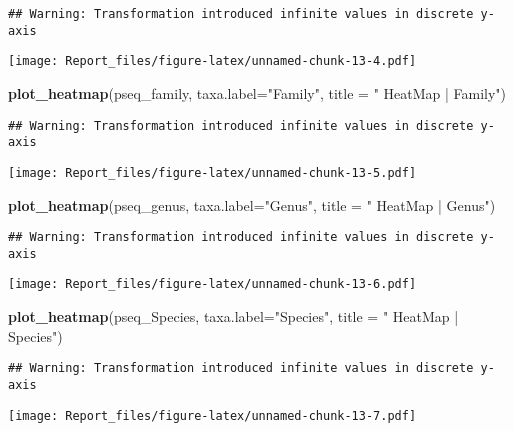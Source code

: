 \documentclass[]{article}
\newenvironment{Shaded}{\begin{snugshade}}{\end{snugshade}}
\newcommand{\DataTypeTok}[1]{\textcolor[rgb]{0.13,0.29,0.53}{#1}}
\newcommand{\KeywordTok}[1]{\textcolor[rgb]{0.13,0.29,0.53}{\textbf{#1}}}
\newcommand{\NormalTok}[1]{#1}
\newcommand{\StringTok}[1]{\textcolor[rgb]{0.31,0.60,0.02}{#1}}
\begin{document}
\begin{verbatim}
## Warning: Transformation introduced infinite values in discrete y-axis
\end{verbatim}

\texttt{[image: Report\_files/figure-latex/unnamed-chunk-13-4.pdf]}

\begin{Shaded}
\begin{Highlighting}[]
\KeywordTok{plot_heatmap}\NormalTok{(pseq_family, }\DataTypeTok{taxa.label=}\StringTok{"Family"}\NormalTok{, }\DataTypeTok{title =} \StringTok{" HeatMap | Family"}\NormalTok{)}
\end{Highlighting}
\end{Shaded}

\begin{verbatim}
## Warning: Transformation introduced infinite values in discrete y-axis
\end{verbatim}

\texttt{[image: Report\_files/figure-latex/unnamed-chunk-13-5.pdf]}

\begin{Shaded}
\begin{Highlighting}[]
\KeywordTok{plot_heatmap}\NormalTok{(pseq_genus, }\DataTypeTok{taxa.label=}\StringTok{"Genus"}\NormalTok{, }\DataTypeTok{title =} \StringTok{" HeatMap | Genus"}\NormalTok{)}
\end{Highlighting}
\end{Shaded}

\begin{verbatim}
## Warning: Transformation introduced infinite values in discrete y-axis
\end{verbatim}

\texttt{[image: Report\_files/figure-latex/unnamed-chunk-13-6.pdf]}

\begin{Shaded}
\begin{Highlighting}[]
\KeywordTok{plot_heatmap}\NormalTok{(pseq_Species, }\DataTypeTok{taxa.label=}\StringTok{"Species"}\NormalTok{, }\DataTypeTok{title =} \StringTok{" HeatMap | Species"}\NormalTok{)}
\end{Highlighting}
\end{Shaded}

\begin{verbatim}
## Warning: Transformation introduced infinite values in discrete y-axis
\end{verbatim}

\texttt{[image: Report\_files/figure-latex/unnamed-chunk-13-7.pdf]}
\end{document}
